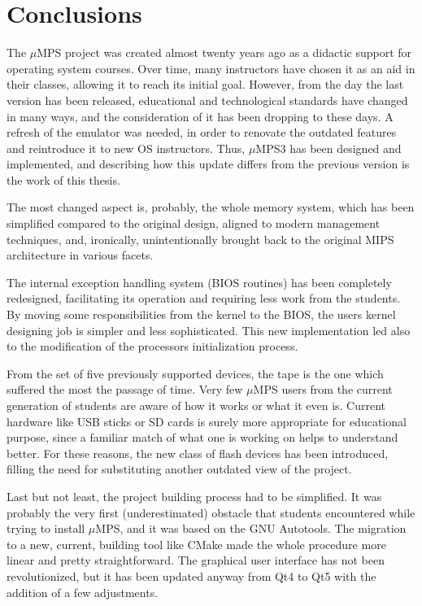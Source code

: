 \documentclass[12pt,a4paper,openright,twoside]{report}
\begin{document}
\chapter{Conclusions}
\lhead[\fancyplain{}{\bfseries\thepage}]{\fancyplain{}{\bfseries\rightmark}}
The $\mu$MPS project was created almost twenty years ago as a didactic support for operating system courses.
Over time, many instructors have chosen it as an aid in their classes, allowing it to reach its initial goal.
However, from the day the last version has been released, educational and technological standards have changed in many ways, and the consideration of it has been dropping to these days.
A refresh of the emulator was needed, in order to renovate the outdated features and reintroduce it to new OS instructors.
Thus, $\mu$MPS3 has been designed and implemented, and describing how this update differs from the previous version is the work of this thesis.

The most changed aspect is, probably, the whole memory system, which has been simplified compared to the original design, aligned to modern management techniques, and, ironically, unintentionally brought back to the original MIPS architecture in various facets.

The internal exception handling system (BIOS routines) has been completely redesigned, facilitating its operation and requiring less work from the students.
By moving some responsibilities from the kernel to the BIOS, the users kernel designing job is simpler and less sophisticated.
This new implementation led also to the modification of the processors initialization process.

From the set of five previously supported devices, the tape is the one which suffered the most the passage of time.
Very few $\mu$MPS users from the current generation of students are aware of how it works or what it even is.
Current hardware like USB sticks or SD cards is surely more appropriate for educational purpose, since a familiar match of what one is working on helps to understand better.
For these reasons, the new class of flash devices has been introduced, filling the need for substituting another outdated view of the project.

Last but not least, the project building process had to be simplified.
It was probably the very first (underestimated) obstacle that students encountered while trying to install $\mu$MPS, and it was based on the GNU Autotools.
The migration to a new, current, building tool like CMake made the whole procedure more linear and pretty straightforward.
The graphical user interface has not been revolutionized, but it has been updated anyway from Qt4 to Qt5 with the addition of a few adjustments.
\end{document}

